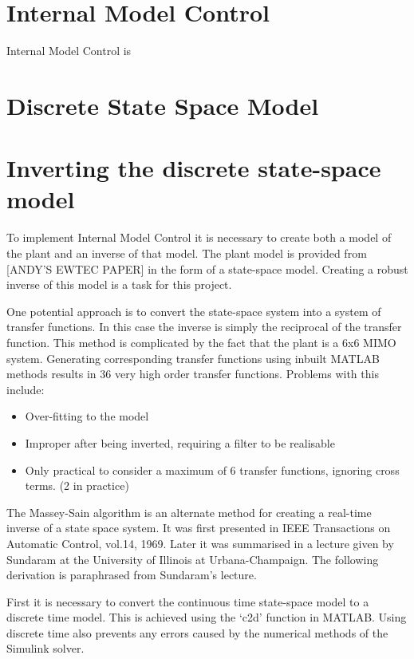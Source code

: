\documentclass{report}
\begin{document}
\section{Internal Model Control}
Internal Model Control is 

\section{Discrete State Space Model}

\section{Inverting the discrete state-space model}
To implement Internal Model Control it is necessary to create both a model of the plant and an inverse of that model. The plant model is provided from [ANDY’S EWTEC PAPER] in the form of a state-space model. Creating a robust inverse of this model is a task for this project.

One potential approach is to convert the state-space system into a system of transfer functions. In this case the inverse is simply the reciprocal of the transfer function. This method is complicated by the fact that the plant is a 6x6 MIMO system. Generating corresponding transfer functions using inbuilt MATLAB methods results in 36 very high order transfer functions. Problems with this include:
\begin{itemize}
	\item{Over-fitting to the model}
	\item{Improper after being inverted, requiring a filter to be realisable}
	\item{Only practical to consider a maximum of 6 transfer functions, ignoring cross terms. (2 in practice)}
\end{itemize}


The Massey-Sain algorithm is an alternate method for creating a real-time inverse of a state space system. It was first presented in IEEE Transactions on Automatic Control, vol.14, 1969. Later it was summarised in a lecture given by Sundaram at the University of Illinois at Urbana-Champaign. The following derivation is paraphrased from Sundaram's lecture.

First it is necessary to convert the continuous time state-space model to a discrete time model. This is achieved using the ‘c2d’ function in MATLAB. Using discrete time also prevents any errors caused by the numerical methods of the Simulink solver.
\end{document}
